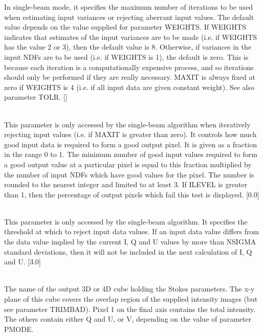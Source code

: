 \documentclass[twoside,11pt]{article}
\renewcommand{\_}{\texttt{\symbol{95}}}
\newcommand{\sstsubsection}[1]{ \item[{#1}] \mbox{} \\}
\newcommand{\sstsubsection}[1]{\item[{#1}]}
\begin{document}
{{{         In single-beam mode, it specifies the maximum number of iterations
         to be used when estimating input variances or rejecting aberrant
         input values. The default value depends on the value supplied for
         parameter WEIGHTS. If WEIGHTS indicates that estimates of the input
         variances are to be made (i.e. if WEIGHTS has the value 2 or 3),
         then the default value is 8. Otherwise, if variances in the input
         NDFs are to be used (i.e. if WEIGHTS is 1), the default is zero.
         This is because each iteration is a computationally expensive
         process, and so iterations should only be performed if they are
         really necessary. MAXIT is always fixed at zero if WEIGHTS is 4
         (i.e. if all input data are given constant weight). See also
         parameter TOLR. []
      }
      \sstsubsection{
         MINFRAC = \_REAL (Read)
      }{
         This parameter is only accessed by the single-beam algorithm
         when iteratively rejecting input values (i.e. if MAXIT is
         greater than zero). It controls how much good input data is
         required to form a good output pixel. It is given as a fraction
         in the range 0 to 1. The minimum number of good input values
         required to form a good output value at a particular pixel is
         equal to this fraction multiplied by the number of input NDFs
         which have good values for the pixel. The number is rounded to
         the nearest integer and limited to at least 3. If ILEVEL is
         greater than 1, then the percentage of output pixels which fail
         this test is displayed. [0.0]
      }
      \sstsubsection{
         NSIGMA = \_REAL (Read)
      }{
         This parameter is only accessed by the single-beam algorithm. It
         specifies the threshold at which to reject input data values. If
         an input data value differs from the data value implied by the
         current I, Q and U values by more than NSIGMA standard
         deviations, then it will not be included in the next calculation
         of I, Q and U. [3.0]
      }
      \sstsubsection{
         OUT = NDF (Read)
      }{
         The name of the output 3D or 4D cube holding the Stokes parameters.
         The x-y plane of this cube covers the overlap region of the
         supplied intensity images (but see parameter TRIMBAD). Pixel 1
         on the final axis contains the total intensity. The others
         contain either Q and U, or V, depending on the value of parameter
         PMODE.
      }
      \sstsubsection{
         PMODE = LITERAL (Read)
}}}
\end{document}
